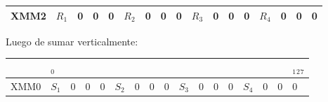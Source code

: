 \documentclass[a4paper]{article}
\begin{document}
\begin{itemize}
\begin{itemize}
\begin{table}[h]
\begin{tabular}{lllllllllllllllll}
\multicolumn{1}{|l|}{XMM2} & \multicolumn{1}{l|}{$R_1$} & \multicolumn{1}{l|}{0} & \multicolumn{1}{l|}{0} & \multicolumn{1}{l|}{0} & \multicolumn{1}{l|}{$R_2$} & \multicolumn{1}{l|}{0} & \multicolumn{1}{l|}{0} & \multicolumn{1}{l|}{0} & \multicolumn{1}{l|}{$R_3$} & \multicolumn{1}{l|}{0} & \multicolumn{1}{l|}{0} & \multicolumn{1}{l|}{0} & \multicolumn{1}{l|}{$R_4$} & \multicolumn{1}{l|}{0} & \multicolumn{1}{l|}{0} & \multicolumn{1}{l|}{0} \\ \hline
\end{tabular}
\end{table}

\begin{table}[h]
\center
Luego de sumar verticalmente:
\begin{tabular}{lllllllllllllllll}
                           & $_0$                       &                        &                        &                        &                            &                        &                        &                        &                            &                        &                        &                        &                            &                        &                        & $_1$$_2$$_7$                    \\ \hline
\multicolumn{1}{|l|}{XMM0} & \multicolumn{1}{l|}{$S_1$} & \multicolumn{1}{l|}{0} & \multicolumn{1}{l|}{0} & \multicolumn{1}{l|}{0} & \multicolumn{1}{l|}{$S_2$} & \multicolumn{1}{l|}{0} & \multicolumn{1}{l|}{0} & \multicolumn{1}{l|}{0} & \multicolumn{1}{l|}{$S_3$} & \multicolumn{1}{l|}{0} & \multicolumn{1}{l|}{0} & \multicolumn{1}{l|}{0} & \multicolumn{1}{l|}{$S_4$} & \multicolumn{1}{l|}{0} & \multicolumn{1}{l|}{0} & \multicolumn{1}{l|}{0} \\ \hline
\end{tabular}
\end{table}


\end{itemize}
\end{itemize}
\end{document}
